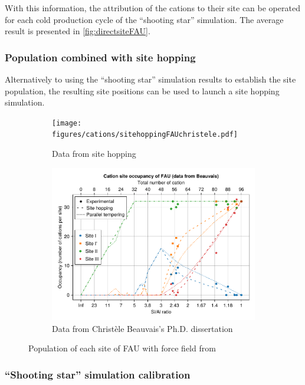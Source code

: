 \documentclass[main.tex]{subfiles}
\begin{document}
With this information, the attribution of the cations to their site can be operated for each cold production cycle of the ``shooting star'' simulation. The average result is presented in \cref{fig:directsiteFAU}.

\subsubsection{Population combined with site hopping}

Alternatively to using the ``shooting star'' simulation results to establish the site population, the resulting site positions can be used to launch a site hopping simulation.

\begin{figure}
	\centering
	\begin{subfigure}{0.9\linewidth}
		\centering
		\texttt{[image: figures/cations/sitehoppingFAUchristele.pdf]}
		\caption{Data from site hopping}\label{fig:sitehopping_jeffroyFF}
	\end{subfigure}

	\begin{subfigure}{0.9\linewidth}
		\centering
		\includegraphics[width=\linewidth]{figures/cations/christele.pdf}
		\caption{Data from Christèle Beauvais's Ph.D. dissertation}
	\end{subfigure}

	\caption{Population of each site of FAU with force field from \textcite{DiLellaFF}}
\end{figure}

\subsubsection{``Shooting star'' simulation calibration}
\end{document}
